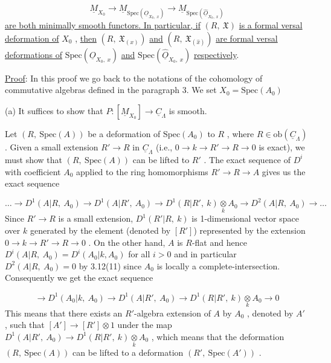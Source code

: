 \begin{equation*}
\underline{M}_{X_0} \to \underline{M}_{\mathrm{Spec}(\underline{O}_{X_0,\ x})} \to \underline{M}_{\mathrm{Spec}(\widehat{\underline{O}}_{X_0,\ x})}
\end{equation*}
\underline{are both minimally smooth functors. In particular, if}  $(R,\ \mathfrak{X})$  \underline{is a formal versal deformation of}  $X_0$  , \underline{then}  $(R,\ \mathfrak{X}_{(x)})$  \underline{and}  $(R,\ \mathfrak{X}_{(\hat{x})})$  \underline{are formal versal deformations of}  $\mathrm{Spec}(\underline{O}_{X_0,\ x})$  \underline{and}  $\mathrm{Spec}(\widehat{\underline{O}}_{X_0,\ x})$  \underline{respectively}.

\underline{Proof}:  In this proof we go back to the notations of the cohomology of commutative algebras defined in the paragraph 3. We set  $X_0 = \mathrm{Spec}(A_0)$



(a)  It suffices to show that  $P : [\underline{M}_{X_0}] \to \underline{C}_{\Lambda}$  is smooth.

Let  $(R,\ \mathrm{Spec}(A))$  be a deformation of  $\mathrm{Spec}(A_0)$  to  $R$  , where  $R \in \mathrm{ob}(\underline{C}_{\Lambda})$  . Given a small extension  $R' \to R$  in  $\underline{C}_{\Lambda}$  (i.e.,  $0 \to k \to R' \to R \to 0$  is exact), we must show that  $(R,\ \mathrm{Spec}(A))$  can be lifted to  $R'$  . The exact sequence of  $D^i$  with coefficient  $A_0$  applied to the ring homomorphisms  $R' \to R \to A$  gives us the exact sequence

\begin{equation*}
\ldots \to D^1(A|R,\ A_0) \to D^1(A|R',\ A_0) \to D^1(R|R',\ k) \underset{k}{\otimes} A_0 \to D^2(A|R,\ A_0) \to \ldots
\end{equation*}
Since  $R' \to R$  is a small extension, $D^1(R'|R,\ k)$  is 1-dimensional vector space over  $k$  generated by the element (denoted by  $[R']$) represented by the extension $0 \to k \to R' \to R \to 0$  . On the other hand,  $A$  is $R$-flat and hence $D^i(A|R,\ A_0) = D^i(A_0|k,A_0)$  for all  $i > 0$  and in particular  $D^2(A|R,\ A_0) = 0$ by 3.12(11) since  $A_0$  is locally a complete-intersection. Consequently we get the exact sequence

\begin{equation*}
\to D^1(A_0|k,\ A_0) \to D^1(A|R',\ A_0) \to D^1(R|R',\ k) \underset{k}{\otimes} A_0 \to 0
\end{equation*}
This means that there exists an $R'$-algebra extension of  $A$  by  $A_0$  , denoted by $A'$  , such that  $[A'] \to [R'] \otimes 1$  under the map  $D^1(A|R',\ A_0) \to D^1(R|R',\ k) \underset{k}{\otimes} A_0$  , which means that the deformation  $(R,\ \mathrm{Spec}(A))$  can be lifted to a deformation $(R',\ \mathrm{Spec}(A'))$  .

